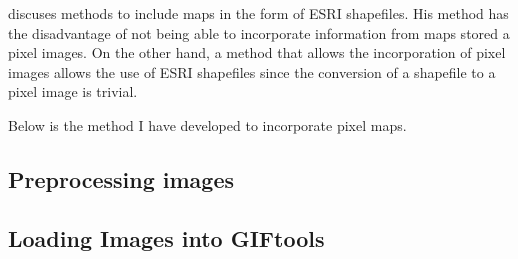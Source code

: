 \cite{williams2008geologically} discuses methods to include maps in the form of ESRI shapefiles. His method has the disadvantage of not being able to incorporate information from maps stored a pixel images. On the other hand, a method that allows the incorporation of pixel images allows the use of ESRI shapefiles since the conversion of a shapefile to a pixel image is trivial.

Below is the method I have developed to incorporate pixel maps.

\subsection{ Preprocessing images}
\label{subsec:Preprocessing images}
%
%
%
%
%
\subsection{Loading Images into GIFtools}
\label{subsec:Load Images into GIFtools}

